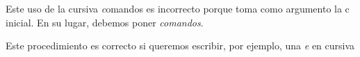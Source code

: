 \documentclass{article}
\begin{document}
Este uso de la cursiva \textit comandos es incorrecto porque toma como 
argumento la c inicial. En su lugar, debemos poner \textit{comandos}.

Este procedimiento es correcto si queremos escribir, por ejemplo, una \textit e en cursiva
\end{document}

